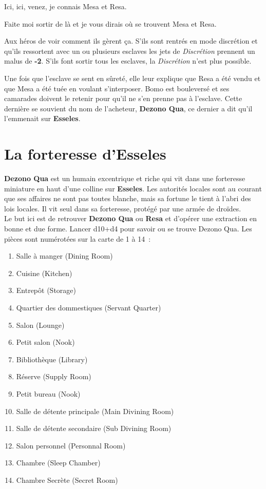 \documentclass{jdrp}
\begin{document}
	\begin{quotebox}
    	Ici, ici, venez, je connais Mesa et Resa.

    	Faite moi sortir de là et je vous dirais où se trouvent Mesa et Resa.
	\end{quotebox}
	Aux héros de voir comment ils gèrent ça. S’ils sont rentrés en mode discrétion et qu’ils ressortent avec un ou plusieurs esclaves les jets de \textit{Discrétion} prennent un malus de \textbf{-2}. S’ils font sortir tous les esclaves, la \textit{Discrétion} n’est plus possible.

	Une fois que l’esclave se sent en sûreté, elle leur explique que Resa a été vendu et que Mesa a été tuée en voulant s’interposer. Bomo est bouleversé et ses camarades doivent le retenir pour qu’il ne s’en prenne pas à l’esclave. Cette dernière se souvient du nom de l’acheteur, \textbf{Dezono Qua}, ce dernier a dit qu’il l’emmenait sur \textbf{Esseles}.

	\section{La forteresse d’Esseles}
	\textbf{Dezono Qua} est un humain excentrique et riche qui vit dans une forteresse miniature en haut d’une colline sur \textbf{Esseles}. Les autorités locales sont au courant que ses affaires ne sont pas toutes blanche, mais sa fortune le tient à l’abri des lois locales. Il vit seul dans sa forteresse, protégé par une armée de droïdes.\\ 

	Le but ici est de retrouver \textbf{Dezono Qua} ou \textbf{Resa} et d’opérer une extraction en bonne et due forme. Lancer d10+d4 pour savoir ou se trouve Dezono Qua. Les pièces sont numérotées sur la carte de 1 à 14~:
	\begin{enumerate}
		\item Salle à manger (Dining Room)
		\item Cuisine (Kitchen)
		\item Entrepôt (Storage)
		\item Quartier des dommestiques (Servant Quarter)
		\item Salon (Lounge)
		\item Petit salon (Nook)
		\item Bibliothèque (Library)
		\item Réserve (Supply Room)
		\item Petit bureau (Nook)
		\item Salle de détente principale (Main Divining Room)
		\item Salle de détente secondaire (Sub Divining Room)
		\item Salon personnel (Personnal Room)
		\item Chambre (Sleep Chamber)
		\item Chambre Secrète (Secret Room)
	\end{enumerate}
	\onecolumn
\end{document}
